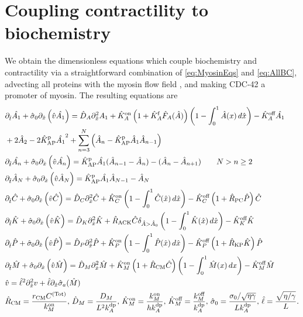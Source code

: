 \documentclass[11pt]{article}
\newcommand{\6}[1]{#1_{\text{6}}}
\newcommand{\3}[1]{#1_{\text{3}}}
\newcommand{\Tot}[1]{#1^\text{(Tot)}}
\newcommand{\My}[1]{#1_M}
\begin{document}
\section{Coupling contractility to biochemistry \label{sec:WithMy}}
We obtain the dimensionless equations which couple biochemistry and contractility via a straightforward combination of \eqref{eq:MyosinEqs} and \eqref{eq:AllBC}, advecting all proteins with the myosin flow field \cite{illukkumbura2023design}, and making CDC-42 a promoter of myosin. The resulting equations are 
\begin{subequations}
\label{eq:Everything}
\begin{align}
& \Dthat \hat{\MA} +\hat{\sigma}_0  \Dxhat \left(\hat{v} \hat{\MA} \right)  = \DhatA \Dxhat^2 \MA +\KhatonA \left(1+\KhatfA \hat F_A(\hat A) \right)\left(1 - \int_0^1 \hat A(x) \, d\hat{x} \right)- \KhatoffA \hat{\MA} \\ \nonumber
 &+ 2 \hat{A}_2-2\KhatpAP \hat{\MA}^2+\sum_{n=3}^N \left(\hat A_n-\KhatpAP \hat A_1 \hat A_{n-1}\right)  \\
&\Dthat \hat{\PA} +\hat{\sigma}_0  \Dxhat \left(\hat{v} \hat{\PA} \right) =\KhatpAP \hat{\MA} (\hat A_{n-1}-\hat A_n) - (\hat A_n-\hat A_{n+1})  \qquad N > n \geq 2 \\ 
& \Dthat \hat A_N +\hat{\sigma}_0  \Dxhat \left(\hat{v} \hat A_N \right)  =\KhatpAP \hat \MA \hat A_{N-1}- \hat A_N \\ 
&\Dthat \hat{C}+\hat{\sigma}_0  \Dxhat \left(\hat{v} \hat{C} \right)  =\DhatC \Dxhat^2 \hat{C} +\KhatonC \left(1 - \int_0^1 \hat{C}(\hat x) \, d\hat{x} \right)  - \KhatoffC \left(1+\hat{R}_\text{PC}\hat P\right)\hat{C}\\
&\Dthat \hat{K} +\hat{\sigma}_0  \Dxhat \left(\hat{v} \hat{K} \right) = \DhatK \Dxhat^2 \hat{K} + \hat{R}_\text{ACK} \hat{C} \delta_{\hat A > \hat A_0} \left(1 - \int_0^1 \hat{K}(\hat x) \, d\hat{x} \right)-\KhatoffK \hat{K} \\
&\Dthat \hat{P} +\hat{\sigma}_0  \Dxhat \left(\hat{v} \hat{P} \right)  =\DhatP \Dxhat^2 \hat{P} +\KhatonP \left(1 - \int_0^1 \hat{P}(\hat x) \, d\hat{x} \right)  - \KhatoffP \left(1+\hat{R}_\text{KP}\hat{K}\right)\hat{P}\\
\label{eq:MyInAll}
&\Dthat \hat{M} +\hat{\sigma}_0  \Dxhat \left(\hat{v} \hat{M} \right) =\hat D_M \Dxhat^2 \hat{M} +\KhatonM \left(1+\hat{R}_\text{CM} \hat C\right) \left(1-\int_0^1  \hat{M}(x) \, dx\right)- \KhatoffM \hat{M}\\
&\hat{v} = \hat{\ell}^2 \Dxhat^2 v +\hat{\ell} \Dxhat \hat{\sigma}_a(\hat{M})\\
\label{eq:NewNDs}
&\hat R_\text{CM}=\frac{r_\text{CM}\Tot{C}}{\kon_M},\, \hat D_M = \frac{D_M}{L^2 \kdp_A},\, \hat{K}^\text{on}_M= \frac{\My{\kon}}{h \kdp_A}, \, \hat{K}^\text{off}_M= \frac{\My{\koff}}{\kdp_A},\, \hat{\sigma}_0 = \frac{\sigma_0/ \sqrt{\eta \gamma} }{L \kdp_A},   \, \hat{\ell} = \frac{\sqrt{\eta/\gamma}}{L}.
\end{align}
\end{subequations}
\end{document}
